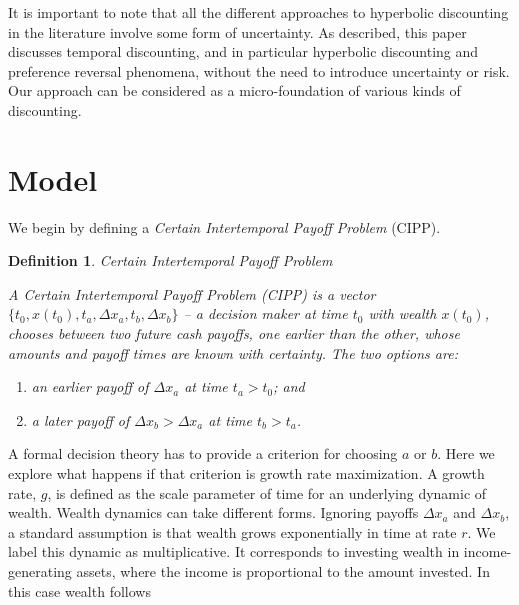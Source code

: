 \documentclass[11pt]{article}
\newtheorem{definition}{Definition}
\newcommand{\Dx}{\Delta x}
\numberwithin{equation}{section}
\begin{document}

It is important to note that all the different approaches to hyperbolic discounting in the literature involve some form of uncertainty. As described, this paper discusses temporal discounting, and in particular hyperbolic discounting and preference reversal phenomena, without the need to introduce uncertainty or risk. Our approach can be considered as a micro-foundation of various kinds of discounting. 


\section{Model}\label{sec:model}

We begin by defining a \textit{Certain Intertemporal Payoff Problem} (CIPP).

\begin{definition}{Certain Intertemporal Payoff Problem}

A Certain Intertemporal Payoff Problem (CIPP) is a vector $\{t_0,x\left(t_0\right),t_a,\Dx_a,t_b,\Dx_b\}$ -- a decision maker at time $t_0$ with wealth $x\left(t_0\right)$, chooses between two future cash payoffs, one earlier than the other, whose amounts and payoff times are known with certainty. The two options are:

\begin{enumerate}
\item[$a$.] an earlier payoff of $\Dx_a$ at time $t_a>t_0$; and
\item[$b$.] a later payoff of $\Dx_b>\Dx_a$ at time $t_b>t_a$.
\end{enumerate}

\end{definition}

A formal decision theory has to provide a criterion for choosing $a$ or $b$. Here we explore what happens if that criterion is growth rate maximization. A growth rate, $g$, is defined as the scale parameter of time for an underlying dynamic of wealth. Wealth dynamics can take different forms. Ignoring payoffs $\Dx_a$ and $\Dx_b$, a standard assumption is that wealth grows exponentially in time at rate $r$. We label this dynamic as multiplicative. It corresponds to investing wealth in income-generating assets, where the income is proportional to the amount invested. In this case wealth follows
\end{document}
